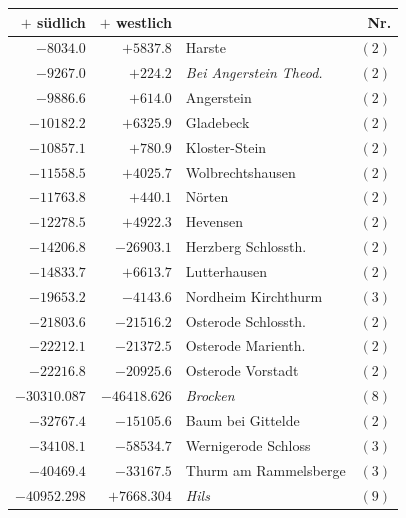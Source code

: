 \begin{center}\begingroup\fontsize{8}{9}\selectfont
\setlength{\tabcolsep}{4pt}
\begin{tabular}{r|r|p{170pt}|r}\hline
\(+\) südlich&\(+\) westlich&&Nr.\\\hline
\(-8034.0\)&\(+5837.8\)&Harste&\((2)\)\\
\(-9267.0\)&\(+224.2\)&\textit{Bei Angerstein Theod.}&\((2)\)\\
\(-9886.6\)&\(+614.0\)&Angerstein&\((2)\)\\
\(-10182.2\)&\(+6325.9\)&Gladebeck&\((2)\)\\
\(-10857.1\)&\(+780.9\)&Kloster-Stein&\((2)\)\\
\(-11558.5\)&\(+4025.7\)&Wolbrechtshausen&\((2)\)\\
\(-11763.8\)&\(+440.1\)&Nörten&\((2)\)\\
\(-12278.5\)&\(+4922.3\)&Hevensen&\((2)\)\\
\(-14206.8\)&\(-26903.1\)&Herzberg Schlossth.&\((2)\)\\
\(-14833.7\)&\(+6613.7\)&Lutterhausen&\((2)\)\\
\(-19653.2\)&\(-4143.6\)&Nordheim Kirchthurm&\((3)\)\\
\(-21803.6\)&\(-21516.2\)&Osterode Schlossth.&\((2)\)\\
\(-22212.1\)&\(-21372.5\)&Osterode Marienth.&\((2)\)\\
\(-22216.8\)&\(-20925.6\)&Osterode Vorstadt&\((2)\)\\
\(-30310.087\)&\(-46418.626\)&\textit{Brocken}&\((8)\)\\
\(-32767.4\)&\(-15105.6\)&Baum bei Gittelde&\((2)\)\\
\(-34108.1\)&\(-58534.7\)&Wernigerode Schloss&\((3)\)\\
\(-40469.4\)&\(-33167.5\)&Thurm am Rammelsberge&\((3)\)\\
\(-40952.298\)&\(+7668.304\)&\textit{Hils}&\((9)\)\\
\hline\end{tabular}\endgroup\end{center}
